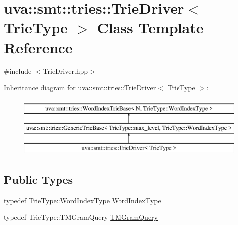 \hypertarget{classuva_1_1smt_1_1tries_1_1_trie_driver}{}\section{uva\+:\+:smt\+:\+:tries\+:\+:Trie\+Driver$<$ Trie\+Type $>$ Class Template Reference}
\label{classuva_1_1smt_1_1tries_1_1_trie_driver}


{\ttfamily \#include $<$Trie\+Driver.\+hpp$>$}

Inheritance diagram for uva\+:\+:smt\+:\+:tries\+:\+:Trie\+Driver$<$ Trie\+Type $>$\+:\begin{figure}[H]
\begin{center}
\leavevmode
\includegraphics[height=3.000000cm]{classuva_1_1smt_1_1tries_1_1_trie_driver}
\end{center}
\end{figure}
\subsection*{Public Types}
\begin{DoxyCompactItemize}
\item 
typedef Trie\+Type\+::\+Word\+Index\+Type \hyperlink{classuva_1_1smt_1_1tries_1_1_trie_driver_a023b5239f73b471b9e8b60dec540c0df}{Word\+Index\+Type}
\item 
typedef Trie\+Type\+::\+T\+M\+Gram\+Query \hyperlink{classuva_1_1smt_1_1tries_1_1_trie_driver_ab7b70ba376d851025035ca71ebe54725}{T\+M\+Gram\+Query}
\end{DoxyCompactItemize}
